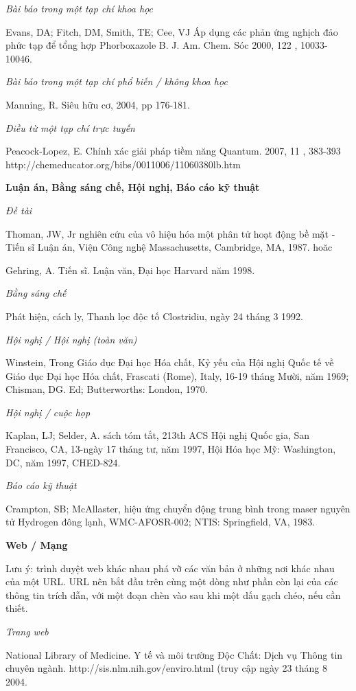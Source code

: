 \documentclass{hcmutarticle}
\begin{document}
{\em Bài báo trong một tạp chí khoa học}

Evans, DA; Fitch, DM, Smith, TE; Cee, VJ Áp dụng các phản ứng nghịch đảo phức tạp để tổng hợp Phorboxazole B. J. Am. Chem. Sóc 2000, 122 , 10033-10046.

{\em Bài báo trong một tạp chí phổ biến / không khoa học}

Manning, R. Siêu hữu cơ, 2004, pp 176-181.

{\em Điều từ một tạp chí trực tuyến}

Peacock-Lopez, E. Chính xác giải pháp tiềm năng Quantum. 2007, 11 , 383-393 http://chemeducator.org/bibs/0011006/11060380lb.htm 

{\bfseries Luận án, Bằng sáng chế, Hội nghị, Báo cáo kỹ thuật}

{\em Đề tài}

Thoman, JW, Jr nghiên cứu của vô hiệu hóa một phân tử hoạt động bề mặt -Tiến sĩ Luận án, Viện Công nghệ Massachusetts, Cambridge, MA, 1987.
hoăc

Gehring, A. Tiến sĩ. Luận văn, Đại học Harvard năm 1998.

{\em Bằng sáng chế}

 Phát hiện, cách ly, Thanh lọc độc tố Clostridiu, ngày 24 tháng 3 1992.

{\em Hội nghị / Hội nghị (toàn văn)}

Winstein, Trong Giáo dục Đại học Hóa chất, Kỷ yếu của Hội nghị Quốc tế về Giáo dục Đại học Hóa chất, Frascati (Rome), Italy, 16-19 tháng Mười, năm 1969; Chisman, DG. Ed; Butterworths: London, 1970.

{\em Hội nghị / cuộc họp }

Kaplan, LJ; Selder, A. sách tóm tắt, 213th ACS Hội nghị Quốc gia, San Francisco, CA, 13-ngày 17 tháng tư, năm 1997, Hội Hóa học Mỹ: Washington, DC, năm 1997, CHED-824.

{\em Báo cáo kỹ thuật }

Crampton, SB; McAllaster, hiệu ứng chuyển động trung bình trong maser nguyên tử Hydrogen đông lạnh, WMC-AFOSR-002; NTIS: Springfield, VA, 1983.

{\bfseries Web / Mạng}

Lưu ý: trình duyệt web khác nhau phá vỡ các văn bản ở những nơi khác nhau của một URL. URL nên bắt đầu trên cùng một dòng như phần còn lại của các thông tin trích dẫn, với một đoạn chèn vào sau khi một dấu gạch chéo, nếu cần thiết.

{\em Trang web}

National Library of Medicine. Y tế và môi trường Độc Chất: Dịch vụ Thông tin chuyên ngành. http://sis.nlm.nih.gov/enviro.html (truy cập ngày 23 tháng 8 2004.
\end{document}
